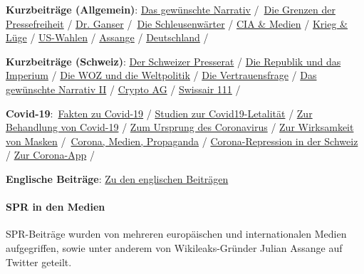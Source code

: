 \textbf{Kurzbeiträge (Allgemein)}:
\href{https://swprs.org/das-gewuenschte-narrativ/}{Das gewünschte
Narrativ} /~\href{https://swprs.org/die-grenzen-der-pressefreiheit/}{Die
Grenzen der Pressefreiheit} /
\href{https://swprs.org/anschlag-auf-die-forschungsfreiheit/}{Dr.
Ganser} /~\href{https://swprs.org/die-schleusenwaerter/}{Die
Schleusenwärter} /
\href{https://swprs.org/der-chefredakteur-und-die-cia/}{CIA \& Medien} /
\href{https://swprs.org/krieg-und-luege/}{Krieg \& Lüge} /
\href{https://swprs.org/us-wahlen-zwischen-demokratie-und-imperium/}{US-Wahlen}
/ \href{https://swprs.org/assange-die-wirklichen-fragen/}{Assange} /
\href{https://swprs.org/deutschland-worum-es-geht/}{Deutschland} /

\textbf{Kurzbeiträge (Schweiz)}:
\href{https://swprs.org/schweizer-presserat-propaganda/}{Der Schweizer
Presserat} / \href{https://swprs.org/die-republik-und-das-imperium/}{Die
Republik und das Imperium} /
\href{https://swprs.org/die-woz-und-die-weltpolitik/}{Die WOZ und die
Weltpolitik} / \href{https://swprs.org/schweizer-medien-vertrauen/}{Die
Vertrauensfrage} /
\href{https://swprs.org/das-gewuenschte-narrativ-ii/}{Das gewünschte
Narrativ II} /
\href{https://swprs.org/die-crypto-und-der-journalismus/}{Crypto AG} /
\href{https://swprs.org/der-absturz-swissair-111/}{Swissair 111} /

\textbf{Covid-19}:~\href{https://swprs.org/covid-19-hinweis-ii/}{Fakten
zu Covid-19} /
\href{https://swprs.org/studies-on-covid-19-lethality/}{Studien zur
Covid19-Letalität} /
\href{https://swprs.org/zur-behandlung-von-covid-19/}{Zur Behandlung von
Covid-19} /
\href{https://swprs.org/ursprung-des-covid-19-virus-die-mojiang-minenarbeiter-hypothese/}{Zum
Ursprung des Coronavirus} /
\href{https://swprs.org/face-masks-evidence/}{Zur Wirksamkeit von
Masken} /~\href{https://swprs.org/corona-medien-propaganda/}{Corona,
Medien, Propaganda} /
\href{https://swprs.org/corona-repression-in-der-schweiz/}{Corona-Repression
in der Schweiz} /
\href{https://swprs.org/corona-app-ein-eklatanter-betrug/}{Zur
Corona-App} /

\textbf{Englische Beiträge}: \href{https://swprs.org/contact/}{Zu den
englischen Beiträgen}

\hypertarget{spr-in-den-medien}{%
\paragraph{SPR in den Medien}\label{spr-in-den-medien}}

SPR-Beiträge wurden von mehreren europäischen und internationalen Medien
aufgegriffen, sowie unter anderem von Wikileaks-Gründer Julian Assange
auf Twitter geteilt.

